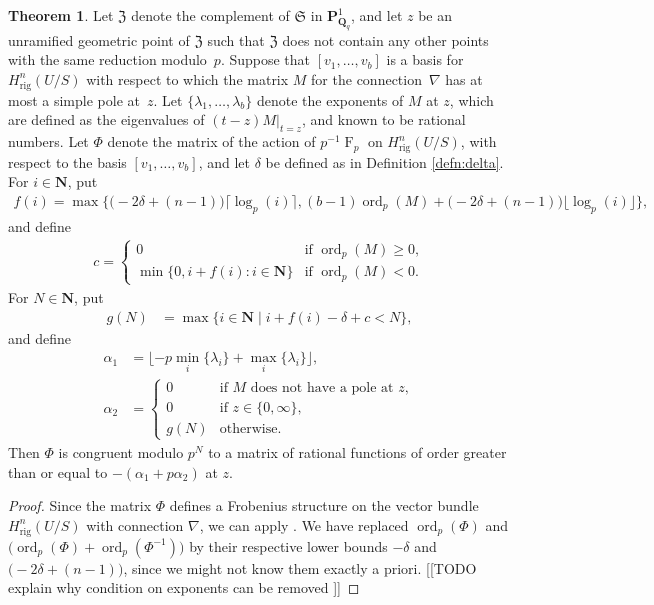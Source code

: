 \documentclass[a4paper,11pt]{article}
\numberwithin{equation}{section}
\newcommand{\NN}{\mathbf{N}} %
\DeclareMathOperator{\ord}{ord}          %
\DeclareMathOperator{\Frob}{F}           %
\providecommand{\Hrig}{H_{\text{rig}}}  %
\theoremstyle{definition}
\newtheorem{thm}{Theorem}[section]
\begin{document}
\begin{thm} \label{thm:KedlayaTuitman}
Let $\mathfrak{Z}$ denote the complement of $\mathfrak{S}$ in $\mathbf{P}^{1}_{\mathbf{Q}_q}$, 
and let $z$ be an unramified geometric point of $\mathfrak{Z}$ such that $\mathfrak{Z}$ does not 
contain any other points with the same reduction modulo~$p$.  Suppose that $[v_1,\dotsc,v_b]$ is 
a basis for $\Hrig^n(U/S)$ with respect to which the matrix $M$ for the connection~$\nabla$ 
has at most a simple pole at~$z$. Let $\{ \lambda_1, \dotsc, \lambda_{b} \}$ denote the exponents 
of $M$ at $z$, which are defined as the eigenvalues of $(t - z) M \vert_{t=z}$, and known to be rational 
numbers. Let $\Phi$ denote the matrix of the action of $p^{-1} \Frob_p$ on $\Hrig^{n}(U/S)$, with respect 
to the basis $[v_1,\dotsc,v_b]$, and let $\delta$ be defined as in Definition
\ref{defn:delta}. 
For $i \in \NN$, put
\begin{align*}
f(i)=\max \{ \bigl( -2 \delta + (n-1) \bigr) \lceil \log_p(i) \rceil, 
(b-1) \ord_p(M) + \bigl( -2 \delta + (n-1) \bigr) \lfloor \log_p(i) \rfloor \},
\end{align*}
and define 
\begin{align*}
c = \begin{cases}
0 & \mbox{if $\ord_p(M) \geq 0$}, \\
\min\{0, i + f(i): i \in \NN\} & \mbox{if $\ord_p(M) < 0$}.
\end{cases}
\end{align*}
For $N \in \NN$, put
\begin{align*}
g(N) &= \max \{i \in \NN \; | \; i + f(i) - \delta + c  < N \},
\end{align*}
and define
\begin{align*}
\alpha_1 &= \lfloor -p \min_i \{ \lambda_i \} + \max_{i} \{\lambda_i\} \rfloor, \\ 
\alpha_2 &=  \left \{ 
         \begin{array}{cl}
         0  & \mbox{if $M$ does not have a pole at $z$},  \\
         0  & \mbox{if $z \in \{0,\infty \}$}, \\
         g(N) & \mbox{otherwise}.
         \end{array}
         \right. 
\end{align*}
Then $\Phi$ is congruent modulo $p^{N}$ to a matrix of rational functions of order greater 
than or equal to $-(\alpha_1+p \alpha_2)$ at $z$. 
\end{thm}

\begin{proof}
Since the matrix $\Phi$ defines a Frobenius structure on the vector bundle $\Hrig^n(U/S)$ with
connection $\nabla$, we can apply \citep[Theorem~2.1]{KedlayaTuitman2012}. We have 
replaced $\ord_p(\Phi)$ and $ \bigl( \ord_p(\Phi)+\ord_p(\Phi^{-1}) \bigr)$ by their respective lower bounds 
$-\delta$ and $\bigl( -2 \delta + (n-1) \bigr)$, since we might not know them exactly a priori.
[[TODO explain why condition on exponents can be removed ]]
\end{proof}
\end{document}
